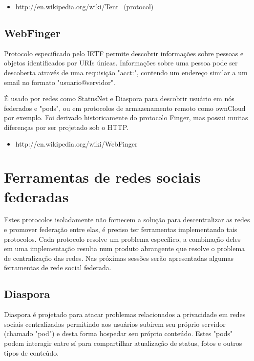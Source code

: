 \documentclass[12pt]{article}
\begin{document}
\begin{itemize}
  \item http://en.wikipedia.org/wiki/Tent\_(protocol)
\end{itemize}

\subsection{WebFinger}

Protocolo especificado pelo IETF permite descobrir informações sobre pessoas e
objetos identificados por URIs únicas. Informações sobre uma pessoa pode ser
descoberta através de uma requisição "acct:", contendo um endereço similar a
um email no formato "usuario@servidor".

É usado por redes como StatusNet e Diaspora para descobrir usuário em nós
federados e "pods", ou em protocolos de armazenamento remoto como ownCloud por
exemplo. Foi derivado historicamente do protocolo Finger, mas possui muitas
diferenças por ser projetado sob o HTTP.

\begin{itemize}
  \item http://en.wikipedia.org/wiki/WebFinger
\end{itemize}

\section{Ferramentas de redes sociais federadas}

Estes protocolos isoladamente não fornecem a solução para descentralizar as
redes e promover federação entre elas, é preciso ter ferramentas implementando
tais protocolos. Cada protocolo resolve um problema específico, a combinação
deles em uma implementação resulta num produto abrangente que resolve o
problema de centralização das redes. Nas próximas sessões serão apresentadas
algumas ferramentas de rede social federada.

\subsection{Diaspora}

Diaspora é projetado para atacar problemas relacionados a privacidade em redes
sociais centralizadas permitindo aos usuários subirem seu próprio servidor
(chamado "pod") e desta forma hospedar seu próprio conteúdo. Estes "pods" podem
interagir entre sí para compartilhar atualização de status, fotos e outros tipos de
conteúdo.
\end{document}
